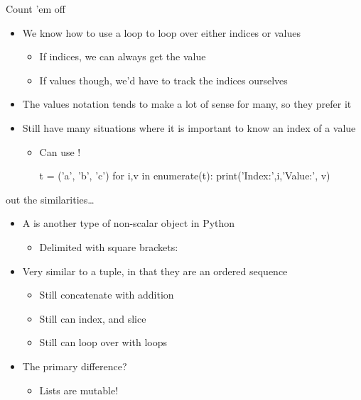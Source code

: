 \documentclass[pdf, aspectratio=169, 12pt]{beamer}
\begin{document}
\begin{frame}[fragile]{Count 'em off}
	\begin{itemize}
		\item We know how to use a  loop to loop over either indices or values
			\begin{itemize}
				\item If indices, we can always get the value
				\item If values though, we'd have to track the indices ourselves
			\end{itemize}
		\item The values notation tends to make a lot of sense for many, so they prefer it
		\item Still have many situations where it is important to know an index of a value
			\begin{itemize}
				\item Can use !
					\begin{pythoncode}
						t = ('a', 'b', 'c')
						for i,v in enumerate(t):
							print('Index:',i,'Value:', v)
					\end{pythoncode}
			\end{itemize}
	\end{itemize}
\end{frame}

\begin{frame}{ out the similarities\ldots}
	\begin{itemize}
		\item<+-> A  is another type of non-scalar object in Python
			\begin{itemize}
				\item Delimited with square brackets: 
			\end{itemize}
		\item<+-> Very similar to a tuple, in that they are an ordered sequence
			\begin{itemize}
				\item Still concatenate with addition
				\item Still can index, and slice
				\item Still can loop over with  loops
			\end{itemize}
		\item<+-> The primary difference?
			\begin{itemize}
				\item Lists are \alert{mutable}!
			\end{itemize}
	\end{itemize}
\end{frame}
\end{document}
